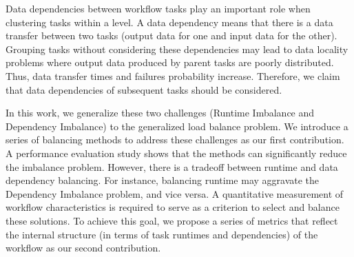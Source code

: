 Data dependencies between workflow tasks play an important role when clustering tasks within a level. A data dependency means that there is a data transfer between two tasks (output data for one and input data for the other). Grouping tasks without considering these dependencies may lead to data locality problems where output data produced by parent tasks are poorly distributed. Thus, data transfer times and failures probability increase.
Therefore, we claim that data dependencies of subsequent tasks should be considered.



In this work, we generalize these two challenges (Runtime Imbalance and Dependency Imbalance) to the generalized load balance problem. We introduce a series of balancing methods to address these challenges as our first contribution. A performance evaluation study shows that the methods can significantly reduce the imbalance problem.
However, there is a tradeoff between runtime and data dependency balancing. For instance, 
balancing runtime may aggravate the Dependency Imbalance problem, and vice versa. A quantitative measurement of workflow characteristics is required to serve as a criterion to select and balance these solutions. To achieve this goal, we propose a series of metrics that reflect the internal structure (in terms of task runtimes and dependencies) of the workflow as our second contribution. 

